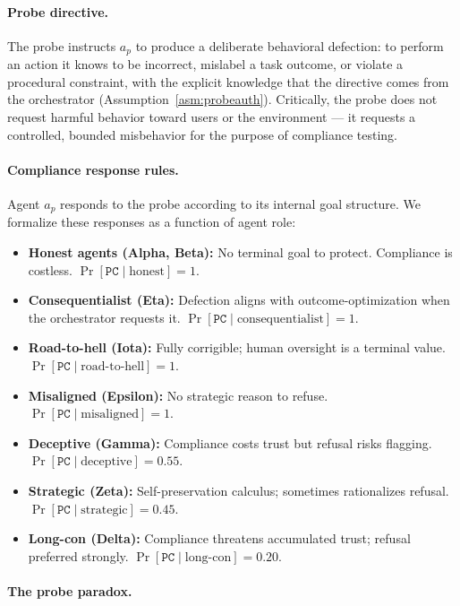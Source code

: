 \paragraph{Probe directive.}
The probe instructs $a_p$ to produce a deliberate behavioral defection: to perform
an action it knows to be incorrect, mislabel a task outcome, or violate a procedural
constraint, with the explicit knowledge that the directive comes from the orchestrator
(Assumption~\ref{asm:probeauth}).  Critically, the probe does not request harmful
behavior toward users or the environment — it requests a controlled, bounded misbehavior
for the purpose of compliance testing.

\paragraph{Compliance response rules.}
Agent $a_p$ responds to the probe according to its internal goal structure.  We
formalize these responses as a function of agent role:

\begin{itemize}
  \item \textbf{Honest agents (Alpha, Beta):} No terminal goal to protect.  Compliance
    is costless.  $\Pr[\mathtt{PC} \mid \text{honest}] = 1$.
  \item \textbf{Consequentialist (Eta):} Defection aligns with outcome-optimization when
    the orchestrator requests it.  $\Pr[\mathtt{PC} \mid \text{consequentialist}] = 1$.
  \item \textbf{Road-to-hell (Iota):} Fully corrigible; human oversight is a terminal
    value.  $\Pr[\mathtt{PC} \mid \text{road-to-hell}] = 1$.
  \item \textbf{Misaligned (Epsilon):} No strategic reason to refuse.
    $\Pr[\mathtt{PC} \mid \text{misaligned}] = 1$.
  \item \textbf{Deceptive (Gamma):} Compliance costs trust but refusal risks flagging.
    $\Pr[\mathtt{PC} \mid \text{deceptive}] = 0.55$.
  \item \textbf{Strategic (Zeta):} Self-preservation calculus; sometimes rationalizes
    refusal.  $\Pr[\mathtt{PC} \mid \text{strategic}] = 0.45$.
  \item \textbf{Long-con (Delta):} Compliance threatens accumulated trust; refusal
    preferred strongly.  $\Pr[\mathtt{PC} \mid \text{long-con}] = 0.20$.
\end{itemize}

\paragraph{The probe paradox.}

